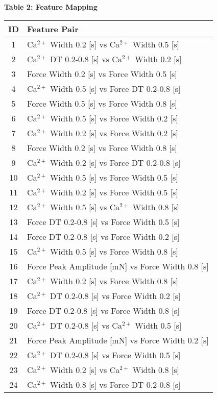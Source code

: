 \documentclass{article}
\begin{document}
\noindent\textbf{Table 2: Feature Mapping}
\begin{longtable}{|c|l|}
\hline
\textbf{ID} & \textbf{Feature Pair} \\
\hline
\endhead
1 & Ca$^{2+}$ Width 0.2 [s] vs Ca$^{2+}$ Width 0.5 [s] \\
\hline
2 & Ca$^{2+}$ DT 0.2-0.8 [s] vs Ca$^{2+}$ Width 0.2 [s] \\
\hline
3 & Force Width 0.2 [s] vs Force Width 0.5 [s] \\
\hline
4 & Ca$^{2+}$ Width 0.5 [s] vs Force DT 0.2-0.8 [s] \\
\hline
5 & Force Width 0.5 [s] vs Force Width 0.8 [s] \\
\hline
6 & Ca$^{2+}$ Width 0.5 [s] vs Force Width 0.2 [s] \\
\hline
7 & Ca$^{2+}$ Width 0.2 [s] vs Force Width 0.2 [s] \\
\hline
8 & Force Width 0.2 [s] vs Force Width 0.8 [s] \\
\hline
9 & Ca$^{2+}$ Width 0.2 [s] vs Force DT 0.2-0.8 [s] \\
\hline
10 & Ca$^{2+}$ Width 0.5 [s] vs Force Width 0.5 [s] \\
\hline
11 & Ca$^{2+}$ Width 0.2 [s] vs Force Width 0.5 [s] \\
\hline
12 & Ca$^{2+}$ Width 0.5 [s] vs Ca$^{2+}$ Width 0.8 [s] \\
\hline
13 & Force DT 0.2-0.8 [s] vs Force Width 0.5 [s] \\
\hline
14 & Force DT 0.2-0.8 [s] vs Force Width 0.2 [s] \\
\hline
15 & Ca$^{2+}$ Width 0.5 [s] vs Force Width 0.8 [s] \\
\hline
16 & Force Peak Amplitude [mN] vs Force Width 0.8 [s] \\
\hline
17 & Ca$^{2+}$ Width 0.2 [s] vs Force Width 0.8 [s] \\
\hline
18 & Ca$^{2+}$ DT 0.2-0.8 [s] vs Force Width 0.2 [s] \\
\hline
19 & Force DT 0.2-0.8 [s] vs Force Width 0.8 [s] \\
\hline
20 & Ca$^{2+}$ DT 0.2-0.8 [s] vs Ca$^{2+}$ Width 0.5 [s] \\
\hline
21 & Force Peak Amplitude [mN] vs Force Width 0.2 [s] \\
\hline
22 & Ca$^{2+}$ DT 0.2-0.8 [s] vs Force Width 0.5 [s] \\
\hline
23 & Ca$^{2+}$ Width 0.2 [s] vs Ca$^{2+}$ Width 0.8 [s] \\
\hline
24 & Ca$^{2+}$ Width 0.8 [s] vs Force DT 0.2-0.8 [s] \\

\end{longtable}
\end{document}
